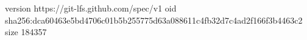 version https://git-lfs.github.com/spec/v1
oid sha256:dca60463e5bd4706c01b5b255775d63a088611c4fb32d7c4ad2f166f3b4463c2
size 184357
